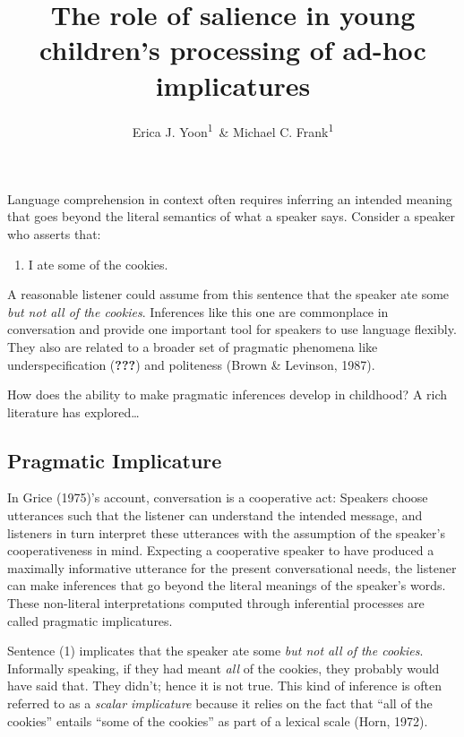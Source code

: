 \documentclass[man]{apa6}
\title{The role of salience in young children's processing of ad-hoc
implicatures}
\author{Erica J. Yoon\textsuperscript{1}~\& Michael C. Frank\textsuperscript{1}}
\affiliation{
    \vspace{0.5cm}
          \textsuperscript{1} Stanford University  }
\providecommand{\tightlist}{%
  \setlength{\itemsep}{0pt}\setlength{\parskip}{0pt}}
\theoremstyle{definition}
\theoremstyle{definition}
\theoremstyle{definition}
\theoremstyle{remark}
\begin{document}
\maketitle

\setcounter{secnumdepth}{0}



Language comprehension in context often requires inferring an intended
meaning that goes beyond the literal semantics of what a speaker says.
Consider a speaker who asserts that:

\begin{enumerate}
\def\labelenumi{(\arabic{enumi})}
\tightlist
\item
  I ate some of the cookies.
\end{enumerate}

\noindent A reasonable listener could assume from this sentence that the
speaker ate some \emph{but not all of the cookies}. Inferences like this
one are commonplace in conversation and provide one important tool for
speakers to use language flexibly. They also are related to a broader
set of pragmatic phenomena like underspecification ({\textbf{???}}) and
politeness (Brown \& Levinson, 1987).

How does the ability to make pragmatic inferences develop in childhood?
A rich literature has explored\ldots{}

\subsection{Pragmatic Implicature}\label{pragmatic-implicature}

In Grice (1975)'s account, conversation is a cooperative act: Speakers
choose utterances such that the listener can understand the intended
message, and listeners in turn interpret these utterances with the
assumption of the speaker's cooperativeness in mind. Expecting a
cooperative speaker to have produced a maximally informative utterance
for the present conversational needs, the listener can make inferences
that go beyond the literal meanings of the speaker's words. These
non-literal interpretations computed through inferential processes are
called pragmatic implicatures.

Sentence (1) implicates that the speaker ate some \emph{but not all of
the cookies}. Informally speaking, if they had meant \emph{all} of the
cookies, they probably would have said that. They didn't; hence it is
not true. This kind of inference is often referred to as a \emph{scalar
implicature} because it relies on the fact that \enquote{all of the
cookies} entails \enquote{some of the cookies} as part of a lexical
scale (Horn, 1972).
\end{document}

